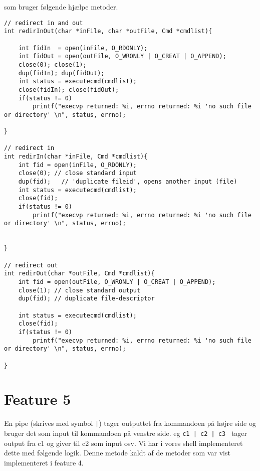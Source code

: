 \documentclass[danish]{report}
\begin{document}
som bruger følgende hjælpe metoder.

\begin{lstlisting}
// redirect in and out
int redirInOut(char *inFile, char *outFile, Cmd *cmdlist){
    
    int fidIn  = open(inFile, O_RDONLY);
    int fidOut = open(outFile, O_WRONLY | O_CREAT | O_APPEND);              
    close(0); close(1);
    dup(fidIn); dup(fidOut);
    int status = executecmd(cmdlist);
    close(fidIn); close(fidOut);
    if(status != 0) 
        printf("execvp returned: %i, errno returned: %i 'no such file or directory' \n", status, errno);

}

// redirect in
int redirIn(char *inFile, Cmd *cmdlist){
    int fid = open(inFile, O_RDONLY);  
    close(0); // close standard input
    dup(fid);   // 'duplicate fileid', opens another input (file)    
    int status = executecmd(cmdlist);
    close(fid);             
    if(status != 0) 
        printf("execvp returned: %i, errno returned: %i 'no such file or directory' \n", status, errno);


}

// redirect out
int redirOut(char *outFile, Cmd *cmdlist){
    int fid = open(outFile, O_WRONLY | O_CREAT | O_APPEND);         
    close(1); // close standard output
    dup(fid); // duplicate file-descriptor

    int status = executecmd(cmdlist);
    close(fid);             
    if(status != 0) 
        printf("execvp returned: %i, errno returned: %i 'no such file or directory' \n", status, errno);

}
\end{lstlisting}





\section{Feature 5}

En pipe (skrives med symbol {\tt |}) tager outputtet fra kommandoen på højre side og bruger det som input til kommandoen på venstre side. eg {\tt c1 | c2 | c3 } tager output fra c1 og giver til c2 som input osv. Vi har i vores shell implementeret dette med følgende logik. Denne metode kaldt af de metoder som var vist implementeret i feature 4.
\end{document}
